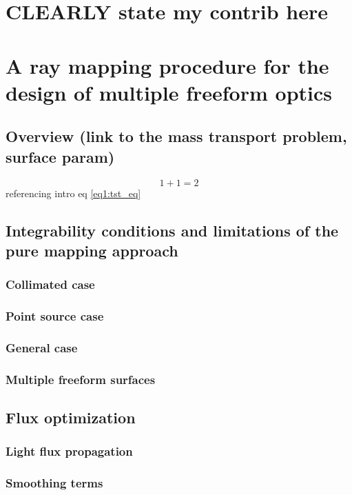 \chapter{CLEARLY state my contrib here}

\chapter{A ray mapping procedure for the design of multiple freeform optics}
\label{ch:core}

\section{Overview (link to the mass transport problem, surface param)}
\begin{equation}
\label{eq3:tst_eq}
1+1=2
\end{equation}
referencing intro eq \eqref{eq1:tst_eq}


\section{Integrability conditions and limitations of the pure mapping approach}
\subsection{Collimated case}
\subsection{Point source case}
\subsection{General case}
\subsection{Multiple freeform surfaces}

\section{Flux optimization}
\subsection{Light flux propagation}
\subsection{Smoothing terms}
